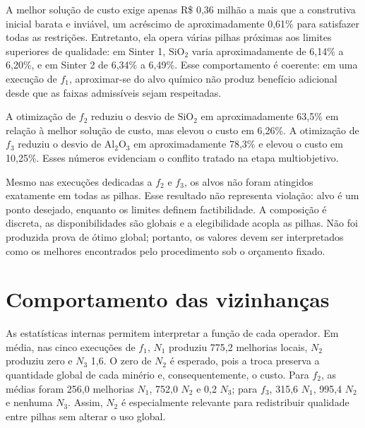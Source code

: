 \documentclass[10pt,twocolumn,a4paper]{article}
\begin{document}
\begin{table}[H]
\centering
\caption{Melhores soluções finais encontradas.}
\label{tab:melhores_solucoes}
\end{table}

A melhor solução de custo exige apenas R\$ 0,36 milhão a mais que a construtiva inicial barata e inviável, um acréscimo de aproximadamente 0,61\% para satisfazer todas as restrições. Entretanto, ela opera várias pilhas próximas aos limites superiores de qualidade: em Sinter 1, $\text{SiO}_2$ varia aproximadamente de 6,14\% a 6,20\%, e em Sinter 2 de 6,34\% a 6,49\%. Esse comportamento é coerente: em uma execução de $f_1$, aproximar-se do alvo químico não produz benefício adicional desde que as faixas admissíveis sejam respeitadas.

A otimização de $f_2$ reduziu o desvio de $\text{SiO}_2$ em aproximadamente 63,5\% em relação à melhor solução de custo, mas elevou o custo em 6,26\%. A otimização de $f_3$ reduziu o desvio de $\text{Al}_2\text{O}_3$ em aproximadamente 78,3\% e elevou o custo em 10,25\%. Esses números evidenciam o conflito tratado na etapa multiobjetivo.

Mesmo nas execuções dedicadas a $f_2$ e $f_3$, os alvos não foram atingidos exatamente em todas as pilhas. Esse resultado não representa violação: alvo é um ponto desejado, enquanto os limites definem factibilidade. A composição é discreta, as disponibilidades são globais e a elegibilidade acopla as pilhas. Não foi produzida prova de ótimo global; portanto, os valores devem ser interpretados como os melhores encontrados pelo procedimento sob o orçamento fixado.

\section{Comportamento das vizinhanças}

As estatísticas internas permitem interpretar a função de cada operador. Em média, nas cinco execuções de $f_1$, $N_1$ produziu 775,2 melhorias locais, $N_2$ produziu zero e $N_3$ 1,6. O zero de $N_2$ é esperado, pois a troca preserva a quantidade global de cada minério e, consequentemente, o custo. Para $f_2$, as médias foram 256,0 melhorias $N_1$, 752,0 $N_2$ e 0,2 $N_3$; para $f_3$, 315,6 $N_1$, 995,4 $N_2$ e nenhuma $N_3$. Assim, $N_2$ é especialmente relevante para redistribuir qualidade entre pilhas sem alterar o uso global.
\end{document}
